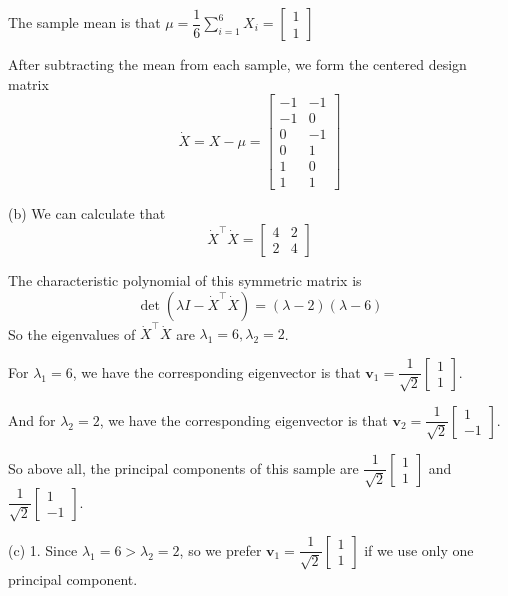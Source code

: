 \documentclass[10pt]{article}
\begin{document}
\begin{enumerate}[1.]
The sample mean is that $\mu=\dfrac{1}{6}\sum\limits_{i=1}^6 X_i=\left[\begin{array}{l}
  1 \\
  1
  \end{array}\right]$

After subtracting the mean from each sample, we form the centered design matrix
$$\dot{X}=X-\mu=
\begin{bmatrix}
  -1 & -1 \\
  -1 & 0 \\
  0 & -1 \\
  0 & 1 \\
  1 & 0 \\
  1 & 1 
\end{bmatrix}
$$

(b) We can calculate that
$$\dot{X}^{\top} \dot{X}=
\begin{bmatrix}
  4 & 2 \\
  2 & 4
\end{bmatrix}$$

The characteristic polynomial of this symmetric matrix is
$$\det(\lambda I - \dot{X}^{\top} \dot{X})=(\lambda-2)(\lambda-6)$$
So the eigenvalues of $\dot{X}^{\top} \dot{X}$ are $\lambda_1=6, \lambda_2=2$.

For $\lambda_1=6$, we have the corresponding eigenvector is that $\mathbf{v}_1=
\dfrac{1}{\sqrt{2}}\begin{bmatrix}
  1 \\
  1
\end{bmatrix}$.

And for $\lambda_2=2$, we have the corresponding eigenvector is that $\mathbf{v}_2=
\dfrac{1}{\sqrt{2}}\begin{bmatrix}
  1 \\
  -1
\end{bmatrix}$.

So above all, the principal components of this sample are 
$\dfrac{1}{\sqrt{2}}\begin{bmatrix}
  1 \\
  1
\end{bmatrix}$ and 
$\dfrac{1}{\sqrt{2}}\begin{bmatrix}
  1 \\
  -1
\end{bmatrix}$.

(c) 1. Since $\lambda_1=6>\lambda_2=2$, so we prefer $\mathbf{v}_1=\dfrac{1}{\sqrt{2}}\begin{bmatrix}
  1 \\
  1
\end{bmatrix}$ if we use only one principal component.\\


\end{enumerate}
\end{document}
